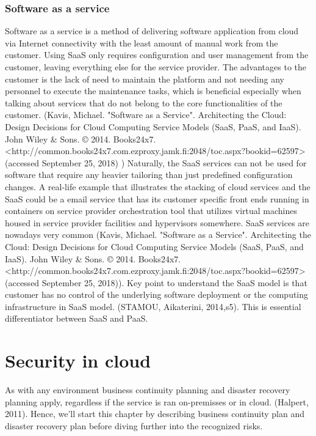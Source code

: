 \documentclass{article}
\begin{document}
\subsubsection{Software as a service}
Software as a service is a method of delivering software application from cloud via Internet connectivity with the least amount of manual work from the customer. Using SaaS only requires configuration and user management from the customer, leaving everything else for the service provider. The advantages to the customer is the lack of need to maintain the platform and not needing any personnel to execute the maintenance tasks, which is beneficial especially when talking about services that do not belong to the core functionalities of the customer. (Kavis, Michael. "Software as a Service". Architecting the Cloud: Design Decisions for Cloud Computing Service Models (SaaS, PaaS, and IaaS). John Wiley \& Sons. © 2014. Books24x7. <http://common.books24x7.com.ezproxy.jamk.fi:2048/toc.aspx?bookid=62597> (accessed September 25, 2018) ) Naturally, the SaaS services can not be used for software that require any heavier tailoring than just predefined configuration changes.
A real-life example that illustrates the stacking of cloud services and the SaaS could be a email service that has its customer specific front ends running in containers on service provider orchestration tool that utilizes virtual machines housed in service provider facilities and hypervisors somewhere. SaaS services are nowadays very common (Kavis, Michael. "Software as a Service". Architecting the Cloud: Design Decisions for Cloud Computing Service Models (SaaS, PaaS, and IaaS). John Wiley \& Sons. © 2014. Books24x7. <http://common.books24x7.com.ezproxy.jamk.fi:2048/toc.aspx?bookid=62597> (accessed September 25, 2018)).
Key point to understand the SaaS model is that customer has no control of the underlying software deployment or the computing infrastructure in SaaS model. (STAMOU, Aikaterini, 2014,s5). This is essential differentiator between SaaS and PaaS.
\section{Security in cloud}
As with any environment business continuity planning and disaster recovery planning apply, regardless if the service is ran on-premisses or in cloud. (Halpert, 2011).
Hence, we'll start this chapter by describing business continuity plan and disaster recovery plan before diving further into the recognized risks.
\end{document}
